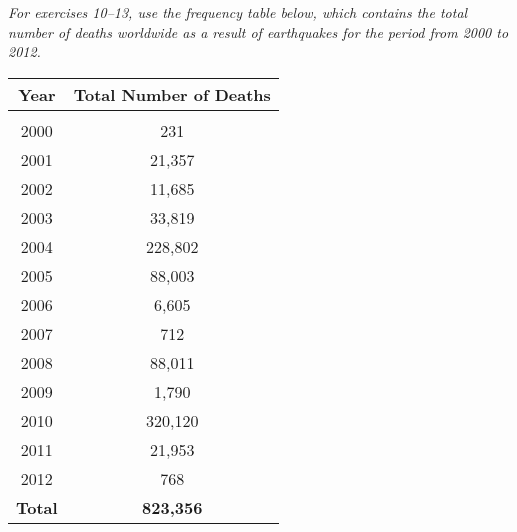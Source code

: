 \emph{For exercises 10--13, use the frequency table below, which contains the total number of deaths worldwide as a result of earthquakes for the period from 2000 to 2012.}
\begin{center}
\begin{tabular}{c c}
\textbf{Year} & \textbf{Total Number of Deaths}\\
\hline
& \\
2000 & 231\\
2001 & 21,357\\
2002 & 11,685\\
2003 & 33,819\\
2004 & 228,802\\
2005 & 88,003\\
2006 & 6,605\\
2007 & 712\\
2008 & 88,011\\
2009 & 1,790\\
2010 & 320,120\\
2011 & 21,953\\
2012 & 768\\
\textbf{Total} & \textbf{823,356}
\end{tabular}
\end{center}

